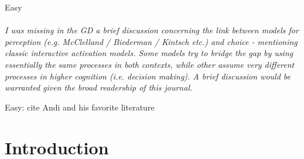 \documentclass[english,natbib,man,floatsintext]{apa6}
\newcommand\eatpunct[1]{}
\newcommand{\com}[2][]{\vspace{5mm}\paragraph[ ]{ \eatpunct}\label{#1}\emph{#2}\vspace{5mm}}
\begin{document}
Easy 


\com[com-r3-XX]{I was missing in the GD a brief discussion concerning the link between models for perception (e.g. McClelland / Biederman / Kintsch etc.) and choice - mentioning classic interactive activation models. Some models try to bridge the gap by using essentially the same processes in both contexts, while other assume very different processes in higher cognition (i.e. decision making). A brief discussion would be warranted given the broad readership of this journal.}

Easy: cite Andi and his favorite literature


\clearpage



\doublespacing
\setcounter{page}{1}
\setcounter{secnumdepth}{0}
\linenumbers

\maketitle

\section{Introduction}

\end{document}
